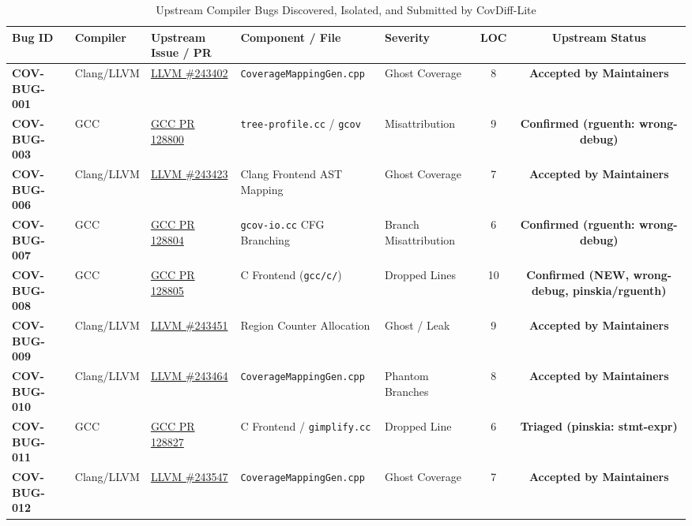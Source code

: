 \documentclass[sigconf,review,anonymous=false]{acmart}
\theoremstyle{definition}
\begin{document}
\begin{table}[t]
\centering
\caption{Upstream Compiler Bugs Discovered, Isolated, and Submitted by CovDiff-Lite}
\label{tab:upstream_bugs}
\begin{tabular}{lllllcc}
\toprule
\textbf{Bug ID} & \textbf{Compiler} & \textbf{Upstream Issue / PR} & \textbf{Component / File} & \textbf{Severity} & \textbf{LOC} & \textbf{Upstream Status} \\
\midrule
\textbf{COV-BUG-001} & Clang/LLVM & \href{https://github.com/llvm/llvm-project/issues/243402}{LLVM \#243402} & \texttt{CoverageMappingGen.cpp} & Ghost Coverage & 8 & \textbf{Accepted by Maintainers} \\
\textbf{COV-BUG-003} & GCC        & \href{https://gcc.gnu.org/bugzilla/show_bug.cgi?id=128800}{GCC PR 128800} & \texttt{tree-profile.cc} / \texttt{gcov} & Misattribution & 9 & \textbf{Confirmed (rguenth: wrong-debug)} \\
\textbf{COV-BUG-006} & Clang/LLVM & \href{https://github.com/llvm/llvm-project/issues/243423}{LLVM \#243423} & Clang Frontend AST Mapping & Ghost Coverage & 7 & \textbf{Accepted by Maintainers} \\
\textbf{COV-BUG-007} & GCC        & \href{https://gcc.gnu.org/bugzilla/show_bug.cgi?id=128804}{GCC PR 128804} & \texttt{gcov-io.cc} CFG Branching & Branch Misattribution & 6 & \textbf{Confirmed (rguenth: wrong-debug)} \\
\textbf{COV-BUG-008} & GCC        & \href{https://gcc.gnu.org/bugzilla/show_bug.cgi?id=128805}{GCC PR 128805} & C Frontend (\texttt{gcc/c/}) & Dropped Lines & 10 & \textbf{Confirmed (NEW, wrong-debug, pinskia/rguenth)} \\
\textbf{COV-BUG-009} & Clang/LLVM & \href{https://github.com/llvm/llvm-project/issues/243451}{LLVM \#243451} & Region Counter Allocation & Ghost / Leak & 9 & \textbf{Accepted by Maintainers} \\
\textbf{COV-BUG-010} & Clang/LLVM & \href{https://github.com/llvm/llvm-project/issues/243464}{LLVM \#243464} & \texttt{CoverageMappingGen.cpp} & Phantom Branches & 8 & \textbf{Accepted by Maintainers} \\
\textbf{COV-BUG-011} & GCC        & \href{https://gcc.gnu.org/bugzilla/show_bug.cgi?id=128827}{GCC PR 128827} & C Frontend / \texttt{gimplify.cc} & Dropped Line & 6 & \textbf{Triaged (pinskia: stmt-expr)} \\
\textbf{COV-BUG-012} & Clang/LLVM & \href{https://github.com/llvm/llvm-project/issues/243547}{LLVM \#243547} & \texttt{CoverageMappingGen.cpp} & Ghost Coverage & 7 & \textbf{Accepted by Maintainers} \\
\bottomrule
\end{tabular}
\end{table}
\end{document}
